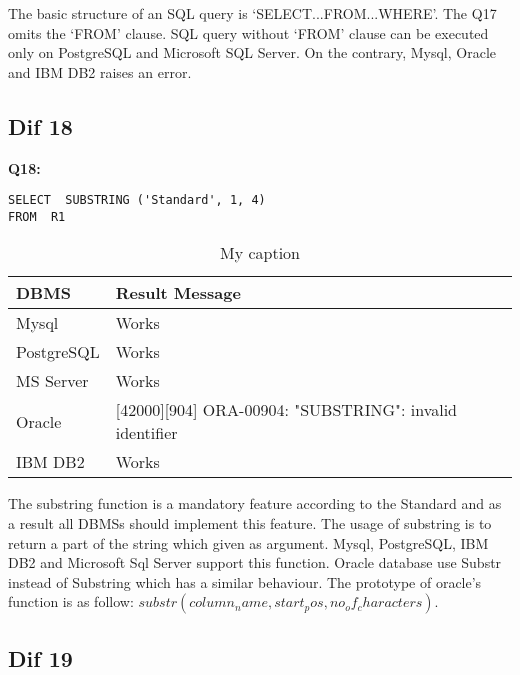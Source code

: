 The basic structure of an SQL query is ‘SELECT...FROM...WHERE’. The Q17 omits the ‘FROM’ clause. SQL query without ‘FROM’ clause can be executed only on PostgreSQL and Microsoft SQL Server. On the contrary, Mysql, Oracle and IBM DB2 raises an error. 


\hfill\newpage
\subsection{Dif 18}


\textbf{Q18:}
\begin{mdframed}[backgroundcolor=lightgray!20]
\begin{lstlisting}[style=SQL]
SELECT  SUBSTRING ('Standard', 1, 4)
FROM  R1
\end{lstlisting}
\end{mdframed}

\begin{table}[h]
\centering
\caption{My caption}
\label{my-label}
\begin{tabular}{|p{2cm}|p{11.5cm}| }
\hline
\textbf{DBMS} & \textbf{Result Message}                                         \\ \hline
Mysql         & Works                                                           \\ \hline
PostgreSQL    & Works                                                           \\ \hline
MS Server     & Works                                                           \\ \hline
Oracle        & {[}42000{]}{[}904{]} ORA-00904: "SUBSTRING": invalid identifier \\ \hline
IBM DB2       & Works                                                           \\ \hline
\end{tabular}
\end{table}

The substring function is a mandatory feature according to the Standard and as a result all DBMSs should implement this feature. The usage of substring is to return a part of the string which given as argument. Mysql, PostgreSQL, IBM DB2 and Microsoft Sql Server support this function. Oracle database use Substr instead of Substring which has a similar behaviour. The prototype of oracle’s function is as follow: $substr (column_name, start_pos , no_of_characters).$ 


\subsection{Dif 19}

